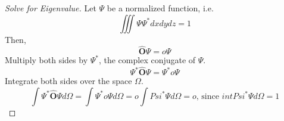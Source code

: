 \begin{proof}[Solve for Eigenvalue] \label{proof:Solve for Eigenvalue}
	Let $\Psi$ be a normalized function, i.e.
	\begin{equation*}
		\iiint \Psi \Psi^{*} dx dy dz =1
	\end{equation*}
	Then,
	\begin{equation*}
		\widehat{\mathbf{O}} \Psi = o \Psi
	\end{equation*}
	Multiply both sides by $\Psi^{*}$, the complex conjugate of $\Psi$.
	\begin{equation*}
		\Psi^{*} \widehat{\mathbf{O}} \Psi = \Psi^{*} o \Psi
	\end{equation*}
	Integrate both sides over the space $\Omega$.
	\begin{equation*}
		\int \Psi^{*} \widehat{\mathbf{O}} \Psi d\Omega = \int \Psi^{*} o \Psi d\Omega
		= o \int Psi^{*} \Psi d\Omega = o \text{, since } int Psi^{*} \Psi d\Omega = 1
	\end{equation*}
\end{proof}